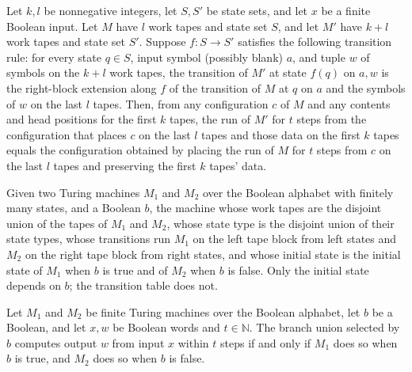 \begin{lemma}
\label{Turing.FinTM.rightCfg_run}
\leanok
{}
Let $k,l$ be nonnegative integers, let $S,S'$ be state sets, and let $x$ be a finite
Boolean input. Let $M$ have $l$ work tapes and state set $S$, and let $M'$ have $k+l$
work tapes and state set $S'$. Suppose $f:S\to S'$ satisfies the following transition
rule: for every state $q\in S$, input symbol (possibly blank) $a$, and tuple $w$ of
symbols on the $k+l$ work tapes, the transition of $M'$ at state $f(q)$ on $a,w$ is the
right-block extension along $f$ of the transition of $M$ at $q$ on $a$ and the symbols
of $w$ on the last $l$ tapes. Then, from any configuration $c$ of $M$ and any contents
and head positions for the first $k$ tapes, the run of $M'$ for $t$ steps from the
configuration that places $c$ on the last $l$ tapes and those data on the first $k$
tapes equals the configuration obtained by placing the run of $M$ for $t$ steps from $c$
on the last $l$ tapes and preserving the first $k$ tapes' data.
\end{lemma}

\begin{definition}
\label{Turing.FinTM.branchTM}
\leanok
{}
Given two Turing machines $M_1$ and $M_2$ over the Boolean alphabet with
finitely many states, and a Boolean $b$, the machine whose work tapes are the
disjoint union of the tapes of $M_1$ and $M_2$, whose state type is the
disjoint union of their state types, whose transitions run $M_1$ on the left
tape block from left states and $M_2$ on the right tape block from right
states, and whose initial state is the initial state of $M_1$ when $b$ is
true and of $M_2$ when $b$ is false.  Only the initial state depends on $b$;
the transition table does not.
\end{definition}

\begin{lemma}
\label{Turing.FinTM.branchTM_computes}
\leanok
{}
Let $M_1$ and $M_2$ be finite Turing machines over the Boolean alphabet, let $b$ be a
Boolean, and let $x,w$ be Boolean words and $t\in\mathbb{N}$. The branch union selected
by $b$ computes output $w$ from input $x$ within $t$ steps if and only if $M_1$ does so
when $b$ is true, and $M_2$ does so when $b$ is false.
\end{lemma}

